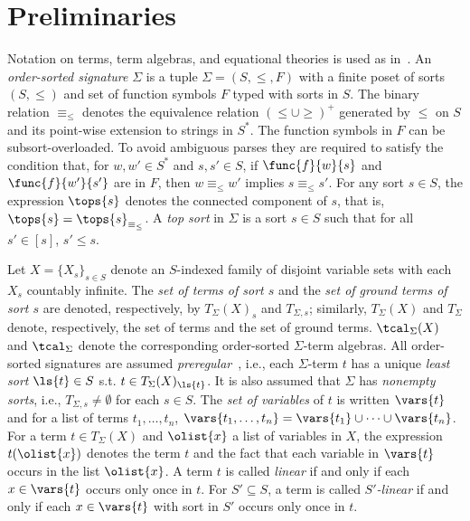 \section{Preliminaries}
\label{sec.prelim}

Notation on terms, term algebras, and equational theories is used as
in~\cite{baader-rewandallthat-1999,goguen-ordsortalg1-1992}.  An {\em
  order-sorted signature} $\Sigma$ is a tuple $\Sigma {=}(S,\leq,F)$
with a finite poset of sorts $(S,\leq)$ and set of function symbols
$F$ typed with sorts in $S$.  The binary relation $\equiv_\leq$
denotes the equivalence relation $(\leq\cup\geq)^+$ generated by
$\leq$ on $S$ and its point-wise extension to strings in $S^*$.  The
function symbols in $F$ can be subsort-overloaded.  To avoid ambiguous
parses they are required to satisfy the condition that, for $w,w' \in
S^*$ and $s,s'\in S$, if $\func{f}{w}{s}$ and $\func{f}{w'}{s'}$ are
in $F$, then $w \equiv_\leq w'$ implies $s \equiv_\leq s'$.  For any
sort $s\in S$, the expression $\tops{s}$ denotes the connected
component of $s$, that is, $\tops{s} = \tops{s}_{\equiv_\leq}$.  A
{\em top sort} in $\Sigma$ is a sort $s \in S$ such that for all $s'
\in [s]$, $s' \leq s$.

Let $X = \{X_s\}_{s\in S}$ denote an $S$-indexed family of disjoint
variable sets with each $X_s$ countably infinite. The {\em set of
  terms of sort $s$} and the {\em set of ground terms of sort $s$} are
denoted, respectively, by $T_\Sigma(X)_s$ and $T_{\Sigma,s}$;
similarly, $T_\Sigma(X)$ and $T_\Sigma$ denote, respectively, the set
of terms and the set of ground terms. $\tcal_\Sigma(X)$ and
$\tcal_\Sigma$ denote the corresponding order-sorted $\Sigma$-term
algebras.  All order-sorted signatures are assumed {\em
  preregular}~\cite{goguen-ordsortalg1-1992}, i.e., each $\Sigma$-term
$t$ has a unique {\em least sort} $\ls{t} \in S$ s.t. $t \in
T_\Sigma(X)_{\ls{t}}$. It is also assumed that $\Sigma$ has {\em
  nonempty sorts}, i.e., $T_{\Sigma,s}\neq \emptyset$ for each $s\in
S$.  The {\em set of variables} of $t$ is written $\vars{t}$ and for a
list of terms $t_1,\ldots,t_n$, $\vars{t_1,\ldots,t_n} = \vars{t_1}
\cup \cdots \cup \vars{t_n}$.  For a term $t\in T_\Sigma(X)$ and
$\olist{x}$ a list of variables in $X$, the expression $t(\olist{x})$
denotes the term $t$ and the fact that each variable in $\vars{t}$
occurs in the list $\olist{x}$. A term $t$ is called \emph{linear} if
and only if each $x \in \vars{t}$ occurs only once in $t$.  For
$S'\subseteq S$, a term is called {\em $S'$-linear} if and only if
each $x \in \vars{t}$ with sort in $S'$ occurs only once in $t$.


